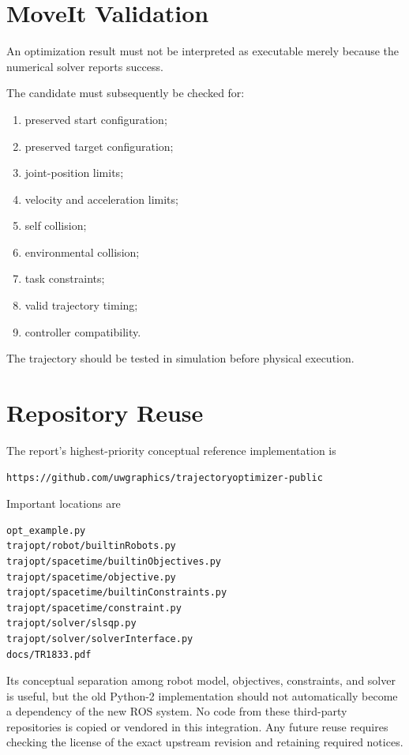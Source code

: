 \documentclass[11pt]{article}
\begin{document}
\section{MoveIt Validation}

An optimization result must not be interpreted as executable
merely because the numerical solver reports success.

The candidate must subsequently be checked for:

\begin{enumerate}
    \item preserved start configuration;
    \item preserved target configuration;
    \item joint-position limits;
    \item velocity and acceleration limits;
    \item self collision;
    \item environmental collision;
    \item task constraints;
    \item valid trajectory timing;
    \item controller compatibility.
\end{enumerate}

The trajectory should be tested in simulation before physical
execution.

\section{Repository Reuse}

The report's highest-priority conceptual reference implementation is

\begin{verbatim}
https://github.com/uwgraphics/trajectoryoptimizer-public
\end{verbatim}

Important locations are

\begin{verbatim}
opt_example.py
trajopt/robot/builtinRobots.py
trajopt/spacetime/builtinObjectives.py
trajopt/spacetime/objective.py
trajopt/spacetime/builtinConstraints.py
trajopt/spacetime/constraint.py
trajopt/solver/slsqp.py
trajopt/solver/solverInterface.py
docs/TR1833.pdf

\end{verbatim}

Its conceptual separation among robot model, objectives,
constraints, and solver is useful, but the old Python-2
implementation should not automatically become a dependency of
the new ROS system. No code from these third-party repositories is copied
or vendored in this integration. Any future reuse requires checking the
license of the exact upstream revision and retaining required notices.
\end{document}
